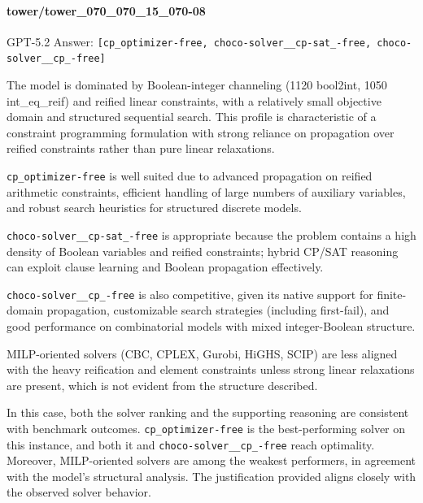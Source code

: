 \documentclass[../../main]{subfiles}
\begin{document}
\paragraph{tower/tower\_070\_070\_15\_070-08}
\begin{floatingdefinition}{GPT-5.2 Answer:}
    \texttt{[cp\_optimizer-free, choco-solver\_\_cp-sat\_-free, choco-solver\_\_cp\_-free]}

    The model is dominated by Boolean-integer channeling (1120 bool2int, 1050 int\_eq\_reif) and reified linear constraints, with a relatively small objective domain and structured sequential search. This profile is characteristic of a constraint programming formulation with strong reliance on propagation over reified constraints rather than pure linear relaxations.

    \texttt{cp\_optimizer-free} is well suited due to advanced propagation on reified arithmetic constraints, efficient handling of large numbers of auxiliary variables, and robust search heuristics for structured discrete models.

    \texttt{choco-solver\_\_cp-sat\_-free} is appropriate because the problem contains a high density of Boolean variables and reified constraints; hybrid CP/SAT reasoning can exploit clause learning and Boolean propagation effectively.

    \texttt{choco-solver\_\_cp\_-free} is also competitive, given its native support for finite-domain propagation, customizable search strategies (including first-fail), and good performance on combinatorial models with mixed integer-Boolean structure.

    MILP-oriented solvers (CBC, CPLEX, Gurobi, HiGHS, SCIP) are less aligned with the heavy reification and element constraints unless strong linear relaxations are present, which is not evident from the structure described.
\end{floatingdefinition}

In this case, both the solver ranking and the supporting reasoning are consistent with benchmark outcomes. \texttt{cp\_optimizer-free} is the best-performing solver on this instance, and both it and \texttt{choco-solver\_\_cp\_-free} reach optimality. Moreover, MILP-oriented solvers are among the weakest performers, in agreement with the model's structural analysis. The justification provided aligns closely with the observed solver behavior.
\end{document}
